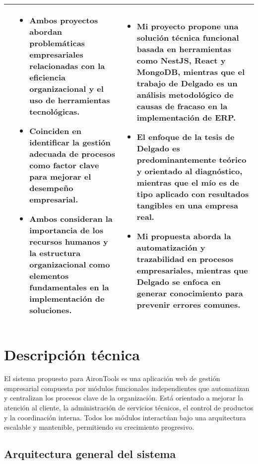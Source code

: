 \begin{longtable}{m{.05\paperwidth} *{2}{m{.33\paperwidth}} @{}}
\cite{Delgado2015} &
\begin{itemize}[topsep=0pt,itemsep=0pt,parsep=0pt,partopsep=0pt,leftmargin=*]
	\item Ambos proyectos abordan problemáticas empresariales relacionadas con la eficiencia organizacional y el uso de herramientas tecnológicas.
	\item Coinciden en identificar la gestión adecuada de procesos como factor clave para mejorar el desempeño empresarial.
	\item Ambos consideran la importancia de los recursos humanos y la estructura organizacional como elementos fundamentales en la implementación de soluciones.
\end{itemize} &
\begin{itemize}[topsep=0pt,itemsep=0pt,parsep=0pt,partopsep=0pt,leftmargin=*]
	\item Mi proyecto propone una solución técnica funcional basada en herramientas como NestJS, React y MongoDB, mientras que el trabajo de Delgado es un análisis metodológico de causas de fracaso en la implementación de ERP.
	\item El enfoque de la tesis de Delgado es predominantemente teórico y orientado al diagnóstico, mientras que el mío es de tipo aplicado con resultados tangibles en una empresa real.
	\item Mi propuesta aborda la automatización y trazabilidad en procesos empresariales, mientras que Delgado se enfoca en generar conocimiento para prevenir errores comunes.
\end{itemize} \\
\midrule


	\bottomrule
	\end{longtable}
	

\section{Descripción técnica}

El sistema propuesto para AironTools es una aplicación web de gestión empresarial compuesta por módulos funcionales independientes que automatizan y centralizan los procesos clave de la organización. Está orientado a mejorar la atención al cliente, la administración de servicios técnicos, el control de productos y la coordinación interna. Todos los módulos interactúan bajo una arquitectura escalable y mantenible, permitiendo su crecimiento progresivo.

\subsection*{Arquitectura general del sistema}


